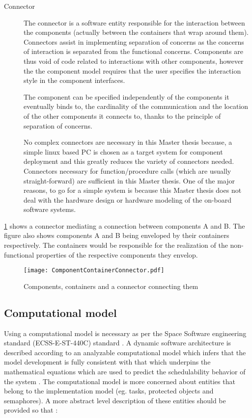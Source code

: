 \begin{description}
\item [Connector] The connector is a software entity responsible for the interaction between the components (actually between the containers that wrap around them). Connectors assist in implementing separation of concerns as the concerns of interaction is separated from the functional concerns. Components are thus void of code related to interactions with other components, however the the component model requires that the user specifies the interaction style in the component interfaces.

The component can be specified independently of the components it eventually binds to, the cardinality of the communication and the location of the other components it connects to, thanks to the principle of separation of concerns. 

No complex connectors are necessary in this Master thesis because, a simple linux based PC is chosen as a target system for component deployment and this greatly reduces the variety of connectors needed. Connectors necessary for function/procedure calls (which are usually straight-forward) are sufficient in this Master thesis. One of the major reasons, to go for a simple system is because this Master thesis does not deal with the hardware design or hardware modeling of the on-board software systems.           
\end{description} 

\cref{fig: Components containers and connectors} shows a connector mediating a connection between components A and B. The figure also shows components A and B being enveloped by their containers respectively. The containers would be responsible for the realization of the non-functional properties of the respective components they envelop. 

\begin{figure}[h]
	\centering
	\texttt{[image: ComponentContainerConnector.pdf]}
	\caption{Components, containers and a connector connecting them}
	\label{fig: Components containers and connectors}
\end{figure} 

\subsection{Computational model}
\label{section: Computational model} 
Using a computational model is necessary as per the Space Software engineering standard (ECSS-E-ST-440C) standard \cite{SAVOIR}. A dynamic software architecture is described according to an analyzable computational model which infers that the model development is fully consistent with that which underpins the mathematical equations which are used to predict the schedulability behavior of the system \cite{ScheduAnaly}. The computational model is more concerned about entities that belong to the implementation model (eg. tasks, protected objects and semaphores). A more abstract level description of these entities should be provided so that \cite{SAVOIR}:

